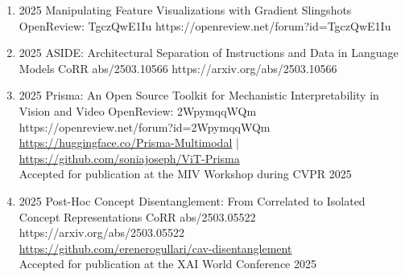 {\begin{enumerate}
                        
    
        \item {}
                        {2025}
                        {Manipulating Feature Visualizations with Gradient Slingshots}
                        {OpenReview: TgczQwE1Iu}
                        {https://openreview.net/forum?id=TgczQwE1Iu}    
    
    
        \item {}
                        {2025}
                        {ASIDE: Architectural Separation of Instructions and Data in Language Models}
                        {CoRR abs/2503.10566}
                        {https://arxiv.org/abs/2503.10566}    

                        
        \item {}
                        {2025}
                        {Prisma: An Open Source Toolkit for Mechanistic Interpretability in Vision and Video}
                        {OpenReview: 2WpymqqWQm}
                        {https://openreview.net/forum?id=2WpymqqWQm}
                        {
                            \\\href{https://huggingface.co/Prisma-Multimodal}{https://huggingface.co/Prisma-Multimodal} | \href{https://github.com/soniajoseph/ViT-Prisma}{https://github.com/soniajoseph/ViT-Prisma}
                            \\ Accepted for publication at the MIV Workshop during CVPR 2025
                        }

                        
        



        \item {}
                        {2025}
                        {Post-Hoc Concept Disentanglement: From Correlated to Isolated Concept Representations}
                        {CoRR abs/2503.05522}
                        {https://arxiv.org/abs/2503.05522}
                        {
                            \\\href{https://github.com/erenerogullari/cav-disentanglement}{https://github.com/erenerogullari/cav-disentanglement}
                            \\ Accepted for publication at the XAI World Conference 2025
                        }
        

\end{enumerate}}
